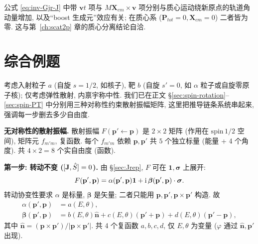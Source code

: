 \begin{remark}
公式 \eqref{eq:inv-Gjr-J} 中带 $\mathbf{v}t$ 项与 $M\mathbf{X}_{cm}\times\mathbf{v}$ 项分别与质心运动绕新原点的轨道角动量增加, 以及``boost 生成元''效应有关; 在质心系 ($\mathbf{P}_{tot}=0,\mathbf{X}_{cm}=0$) 二者皆为零. 这与第~\ref{ch:scat2p} 章的质心分离结论自洽.
\end{remark}


\section{综合例题}\label{sec:inv-examples}

\begin{example}[自旋 $1/2$ + 自旋 $0$ 散射: 转动 $+$ 宇称 $+$ 时间反演的联合限制]\label{ex:inv-half-zero}
考虑入射粒子 $a$ (自旋 $s=1/2$, 如核子), 靶 $b$ (自旋 $s'=0$, 如 $\alpha$ 粒子或自旋零原子核); 仅考虑弹性散射, 内禀宇称中性. 我们已在正文 \S\ref{sec:spin-rotation}--\ref{sec:spin-PT} 中分别用三种对称性约束散射振幅矩阵, 这里把推导链条系统串起来, 强调每一步删去多少自由度.

\textbf{无对称性的散射振幅.}
散射振幅 $F(\mathbf{p}'\leftarrow\mathbf{p})$ 是 $2\times 2$ 矩阵 (作用在 $\mathrm{spin}\,1/2$ 空间), 矩阵元 $f_{m'm}$, 复函数. 每个 $f_{m'm}$ 依赖 $\mathbf{p},\mathbf{p}'$ 共 $5$ 个独立标量 (能量 + 4 个角度). 共 $4\times 2=8$ 个实自由度 (函数).

\textbf{第一步: 转动不变 ($[\mathbf{J},\hat{S}]=0$).}
由 \S\ref{sec:Jrep}, $F$ 可在 $\bm{1},\bm{\sigma}$ 上展开:
\begin{equation}\label{eq:inv-ex-F1}
F(\mathbf{p}',\mathbf{p})=\alpha(\mathbf{p}',\mathbf{p})\bm{1}+\mathrm{i}\,\bm{\beta}(\mathbf{p}',\mathbf{p})\cdot \bm{\sigma}.
\end{equation}
转动协变性要求 $\alpha$ 是标量, $\bm{\beta}$ 是矢量; 二者只能用 $\mathbf{p},\mathbf{p}',\mathbf{p}\times\mathbf{p}'$ 构造. 故
\begin{align}
\alpha(\mathbf{p}',\mathbf{p})&=a(E,\theta),\label{eq:inv-ex-a}\\
\bm{\beta}(\mathbf{p}',\mathbf{p})&=b(E,\theta)\hat{\mathbf{n}}+c(E,\theta)(\mathbf{p}'+\mathbf{p})+d(E,\theta)(\mathbf{p}'-\mathbf{p}),\label{eq:inv-ex-bcd}
\end{align}
其中 $\hat{\mathbf{n}}=(\mathbf{p}\times\mathbf{p}')/|\mathbf{p}\times\mathbf{p}'|$. 共 4 个复函数 $a,b,c,d$, 仅 $E,\theta$ 为变量 ($\varphi$ 通过 $\hat{\mathbf{n}},\mathbf{p}'$ 出现).


\end{example}
